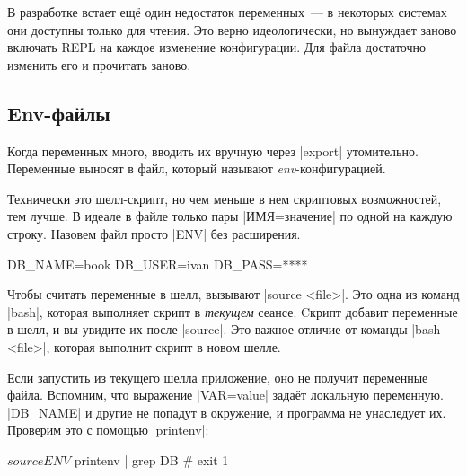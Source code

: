В разработке встает ещ\"{е} один недостаток переменных~--- в некоторых системах
они доступны только для чтения. Это верно идеологически, но вынуждает заново
включать REPL на каждое изменение конфигурации. Для файла достаточно изменить
его и прочитать заново.

\subsection{Env-файлы}


Когда переменных много, вводить их вручную через \spverb|export|
утомительно. Переменные выносят в файл, который называют
\emph{env}-конфигурацией.

Технически это шелл-скрипт, но чем меньше в нем скриптовых возможностей, тем
лучше. В идеале в файле только пары \spverb|ИМЯ=значение| по одной на каждую
строку. Назовем файл просто \spverb|ENV| без расширения.

\begin{english}
  \begin{bash}
DB_NAME=book
DB_USER=ivan
DB_PASS=****
  \end{bash}
\end{english}

Чтобы считать переменные в шелл, вызывают \spverb|source <file>|. Это одна из
команд \spverb|bash|, которая выполняет скрипт в \emph{текущем} сеансе. Cкрипт
добавит переменные в шелл, и вы увидите их после \spverb|source|. Это
важное отличие от команды \spverb|bash <file>|, которая выполнит скрипт в новом
шелле.

\begin{english}
\end{english}

Если запустить из текущего шелла приложение, оно не получит переменные
файла. Вспомним, что выражение \spverb|VAR=value| зада\"{е}т локальную
переменную. \spverb|DB_NAME| и другие не попадут в окружение, и программа не
унаследует их. Проверим это с помощью \spverb|printenv|:


\begin{english}
  \begin{bash}
$ source ENV
$ printenv | grep DB
# exit 1
  \end{bash}
\end{english}

